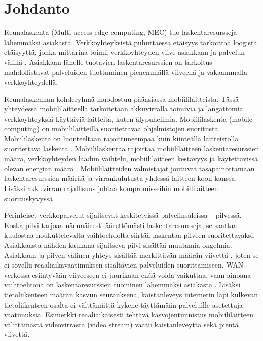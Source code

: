 
\section{Johdanto}
Reunalaskenta (Multi-access edge computing, MEC) tuo laskentaresursseja lähemmäksi asiakasta.
Verkkoyhteyksistä puhuttaessa etäisyys tarkoittaa loogista etäisyyttä, jonka mittarina toimii verkkoyhteyden viive asiakkaan ja palvelun välillä \cite{satyanarayanan2017emergence}.
Asiakkaan lähelle tuotavien laskentaresurssien on tarkoitus mahdollistavat palveluiden tuottaminen pienemmällä viiveellä ja vakaammalla verkkoyhteydellä.



Reunalaskennan kohderyhmä muodostuu pääasiassa mobiililaitteista. 
Tässä yhteydessä mobiililaitteella tarkoitetaan akkuvirralla toimivia ja langattomia verkkoyhteyksiä käyttäviä laitteita, kuten älypuhelimia.
Mobiililaskenta (mobile computing) on mobiililaitteilla suoritettavaa ohjelmistojen suoritusta. 
Mobiililaskenta on luonteeltaan rajoittuneempaa kuin kiinteällä laitteistolla suoritettava laskenta \cite{ha2013just}.
Mobiililaskentaa rajoittaa mobiililaitteen laskentaresurssien määrä, verkkoyhteyden laadun vaihtelu, mobiililaitteen kestävyys ja käytettävissä olevan energian määrä \cite{satya96}. 
Mobiililaitteiden valmistajat joutuvat tasapainottamaan laskentaresurssien määrää ja virrankulutusta yhdessä laitteen koon kanssa.
Lisäksi akkuvirran rajallisuus johtaa kompromisseihin mobiililaitteen suorituskyvyssä \cite{satya01pervasive}.

Perinteiset verkkopalvelut sijaitsevat keskitetyissä palvelinsaleissa – pilvessä.
Koska pilvi tarjoaa näennäisesti äärettömästi laskentaresursseja, se saattaa kuulostaa houkuttelevalta vaihtoehdolta siirtää laskentaa pilveen suoritettavaksi.
Asiakkaasta nähden kaukana sijaitseva pilvi sisältää muutamia ongelmia.
Asiakkaan ja pilven välinen yhteys sisältää merkittävän määrän viivettä \cite{satya09}, joten se ei sovellu reaaliaikavaatimuksen sisältävien palveluiden suorittamiseen.
WAN-verkossa esiintyvään viiveeseen ei juurikaan enää voida vaikuttaa, vaan ainoana vaihtoehtona on laskentaresurssien tuominen lähemmäksi asiakasta \cite{satya09}.
Lisäksi tietoliikenteen määrän kasvun seurauksena, kaistanleveys internetin läpi kulkevan tietoliikenteen osalta ei välttämättä kykene täyttämään palveluille asetettuja vaatimuksia. 
Esimerkki reaaliaikaisesti tehtävä kasvojentunnistus mobiililaitteen välittämästä videovirrasta (video stream) vaatii kaistanleveyttä sekä pientä viivettä.

